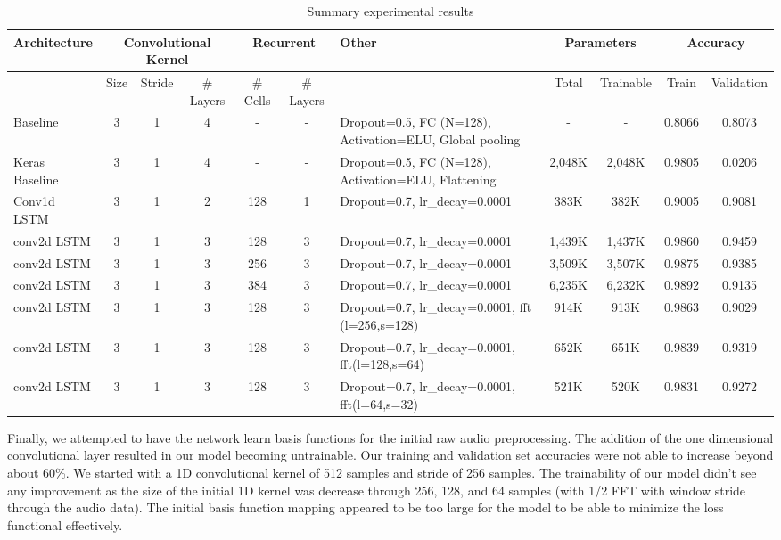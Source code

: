 \documentclass{article}
\begin{document}
\begin{table}
  \resizebox{\textwidth}{!} {
    \begin{tabular} { |m{2.5cm}|c|c|c|c|c|m{5cm}|c|c|c|c| }
      \hline
      Architecture & \multicolumn{3}{|c|}{Convolutional Kernel} &
      \multicolumn{2}{|c|}{Recurrent} & Other &
      \multicolumn{2}{|c|}{Parameters} & \multicolumn{2}{|c|}{Accuracy} \\
      \hline
      & Size & Stride & \# Layers &
      \# Cells & \# Layers & &
      Total & Trainable & Train & Validation \\ \hline
      \hline
      Baseline & 3 & 1 & 4 &
      - & - & Dropout=0.5, FC (N=128), Activation=ELU, Global pooling &
      - & - & 0.8066 & 0.8073 \\ \hline
      \hline
      Keras Baseline & 3 & 1 & 4 &
      - & - & Dropout=0.5, FC (N=128), Activation=ELU, Flattening &
      2,048K & 2,048K & 0.9805 & 0.0206 \\ \hline
      \hline
      Conv1d LSTM & 3 & 1 & 2 &
      128 & 1 & Dropout=0.7, lr\_decay=0.0001 &
      383K & 382K & 0.9005 & 0.9081 \\ \hline
      \hline
      conv2d LSTM & 3 & 1 & 3 &
      128 & 3 & Dropout=0.7, lr\_decay=0.0001 &
      1,439K & 1,437K & 0.9860 & 0.9459 \\ \hline
      \hline
      conv2d LSTM & 3 & 1 & 3 &
      256 & 3 & Dropout=0.7, lr\_decay=0.0001 &
      3,509K & 3,507K & 0.9875 & 0.9385 \\ \hline
      conv2d LSTM & 3 & 1 & 3 &
      384 & 3 & Dropout=0.7, lr\_decay=0.0001 &
      6,235K & 6,232K & 0.9892 & 0.9135 \\ \hline
      \hline
      conv2d LSTM & 3 & 1 & 3 &
      128 & 3 & Dropout=0.7, lr\_decay=0.0001,
      fft (l=256,s=128) &
      914K & 913K & 0.9863 & 0.9029 \\ \hline
      conv2d LSTM & 3 & 1 & 3 &
      128 & 3 & Dropout=0.7, lr\_decay=0.0001,
      fft(l=128,s=64) &
      652K & 651K & 0.9839 & 0.9319 \\ \hline
      conv2d LSTM & 3 & 1 & 3 &
      128 & 3 & Dropout=0.7, lr\_decay=0.0001,
      fft(l=64,s=32) &
      521K & 520K & 0.9831 & 0.9272 \\ \hline
    \end{tabular}
  }
  \caption{Summary experimental results}
  \label{tab:summary-results}
\end{table}
Finally, we attempted to have the network learn basis functions for
the initial raw audio preprocessing. The addition of the one
dimensional convolutional layer resulted in our model becoming
untrainable. Our training and validation set accuracies were not able
to increase beyond about 60\%. We started with a 1D convolutional
kernel of 512 samples and stride of 256 samples. The trainability of
our model didn't see any improvement as the size of the initial 1D
kernel was decrease through 256, 128, and 64 samples (with 1/2 FFT
with window stride through the audio data). The initial basis function
mapping appeared to be too large for the model to be able to minimize
the loss functional effectively.
\end{document}
